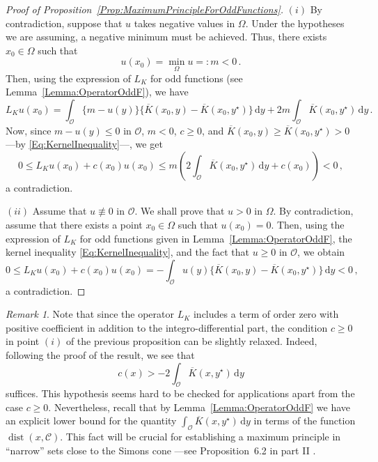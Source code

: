 \documentclass[12pt,reqno]{amsart}
\theoremstyle{definition}
\theoremstyle{remark}
\newtheorem{remark}[theorem]{Remark}
\newcommand{\ccal}{\mathscr{C}}
\newcommand{\ocal}{\mathcal{O}}
\renewcommand{\d}{\,\mathrm{d}} %
\DeclareMathOperator{\dist}{dist}
\numberwithin{equation}{section}
\begin{document}
\begin{proof}[Proof of Proposition~\ref{Prop:MaximumPrincipleForOddFunctions}]
	$(i)$ By contradiction, suppose that $u$ takes negative values in $\Omega$. Under the hypotheses we are assuming, a negative minimum must be achieved. Thus, there exists $x_0\in \Omega$ such that
	$$
	u(x_0) = \min_{\Omega} u =: m < 0\,.
	$$
	Then, using the expression of $L_K$ for odd functions (see Lemma~\ref{Lemma:OperatorOddF}), we have
	$$
	L_K u (x_0) = \int_{\ocal} \{m - u(y) \} \{\overline{K}(x_0, y) - \overline{K}(x_0, y^\star)  \} \d y +  2 m \int_{\ocal} \overline{K}(x_0, y^\star) \d y\,.
	$$
	Now, since $m - u(y) \leq 0$ in $\ocal$, $m<0$, $c\geq 0$, and $\overline{K}(x_0, y) \geq \overline{K}(x_0, y^\star)>0$ ---by \eqref{Eq:KernelInequality}---, we get
	$$
	0 \leq L_K  u(x_0) + c(x_0) u(x_0) \leq m \left(2\int_{\ocal} \overline{K}(x_0, y^\star) \d y + c(x_0)\right)  < 0\,,
	$$
	a contradiction.
	
	$(ii)$ 
	Assume that $u \not \equiv 0$ in $\ocal$. We shall prove that $u > 0$ in $\Omega$. By contradiction, assume that there exists a point $x_0\in \Omega$ such that $u(x_0)= 0$. Then, using the expression of $L_K $ for odd functions given in Lemma~\ref{Lemma:OperatorOddF}, the kernel inequality \eqref{Eq:KernelInequality}, and the fact that $u\geq 0$ in $\ocal$, we obtain
	$$
	0 \leq L_K u(x_0) + c(x_0) u(x_0) = - \int_{\ocal} u(y)\big \{\overline{K}(x_0, y) - \overline{K}(x_0, y^\star) \big \}\d y < 0\,,
	$$
	a contradiction.
\end{proof}

\begin{remark}
	Note that since the operator $L_K$ includes a term of order zero with positive coefficient in addition to the integro-differential part, the condition $c\geq 0$ in point $(i)$ of the previous proposition can be slightly relaxed. Indeed, following the proof of the result, we see that
	$$ c(x) > -2\int_{\ocal} \overline{K}(x, y^\star) \d y $$
	suffices.
	This hypothesis seems hard to be checked for applications apart from the case $c\geq 0$. Nevertheless, recall that by Lemma~\ref{Lemma:OperatorOddF} we have an explicit lower bound for the quantity $ \int_{\ocal} \overline{K}(x, y^\star) \d y $ in terms of the function $\dist(x,\ccal)$. This fact will be crucial for establishing a maximum principle in ``narrow'' sets close to the Simons cone ---see Proposition~6.2 in part II \cite{FelipeSanz-Perela:IntegroDifferentialII}.
\end{remark}


\end{document}
